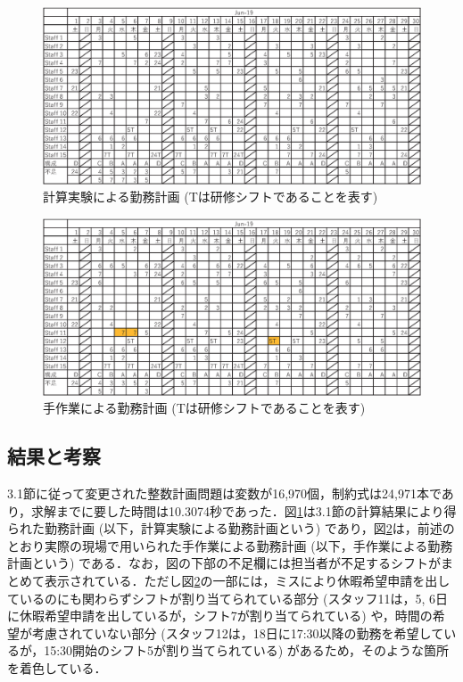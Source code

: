 \documentclass[twocolumn]{jsarticle}
\begin{document}
\begin{figure}
\begin{center}
\includegraphics[width = 13.2cm]{figs/june_optimal.eps}
\end{center}
\caption{計算実験による勤務計画 (Tは研修シフトであることを表す)}
\label{fig:optimal}
\end{figure}
\begin{figure}
\begin{center}
\includegraphics[width = 13.2cm]{figs/june_operation.eps}
\end{center}
\caption{手作業による勤務計画 (Tは研修シフトであることを表す)}
\label{fig:operation}
\end{figure}
\vspace{\baselineskip}
\subsection{結果と考察}
3.1節に従って変更された整数計画問題は変数が16,970個，制約式は24,971本であり，求解までに要した時間は10.3074秒であった．図\ref{fig:optimal}は3.1節の計算結果により得られた勤務計画 (以下，計算実験による勤務計画という) であり，図\ref{fig:operation}は，前述のとおり実際の現場で用いられた手作業による勤務計画 (以下，手作業による勤務計画という) である．なお，図の下部の不足欄には担当者が不足するシフトがまとめて表示されている．ただし図\ref{fig:operation}の一部には，ミスにより休暇希望申請を出しているのにも関わらずシフトが割り当てられている部分 (スタッフ11は，5, 6日に休暇希望申請を出しているが，シフト7が割り当てられている) や，時間の希望が考慮されていない部分 (スタッフ12は，18日に17:30以降の勤務を希望しているが，15:30開始のシフト5が割り当てられている) があるため，そのような箇所を着色している．
\end{document}
